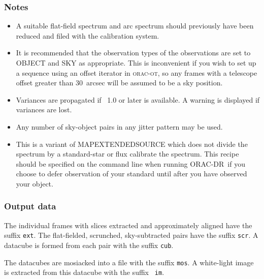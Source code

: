 \documentclass[twoside,11pt]{article}
\newcommand{\xref}[3]{#1}
\renewcommand{\_}{\texttt{\symbol{95}}}
\newcommand{\KAPPA}{\xref{{\sc{Kappa}}}{sun95}{}}
\newcommand{\ORACDR}{{\footnotesize ORAC-DR}}
\begin{document}
\subsubsection*{Notes}\begin{itemize}
\item 
  
  A suitable flat-field spectrum and arc spectrum should previously
  have been reduced and filed with the calibration system.

\item 

It is recommended that the observation types of the observations are set
to OBJECT and SKY as appropriate. This is inconvenient if you wish to
set up a sequence using an offset iterator in \textsc{orac-ot}, so any frames
with a telescope offset greater than 30~arcsec will be assumed to be a
sky position.

\item 

Variances are propagated if \KAPPA\ 1.0 or later is available. A warning
is displayed if variances are lost.

\item 

Any number of sky-object pairs in any jitter pattern may be used.

\item 
    This is a variant of MAP\_EXTENDED\_SOURCE which does not divide the
  spectrum by a standard-star or flux calibrate the spectrum. This
  recipe should be specified on the command line when running
  \ORACDR\ if you choose to defer observation of your standard until
  after you have observed your object.
  

\end{itemize}

\subsubsection*{Output data}

The individual frames with slices extracted and approximately aligned
have the suffix {\tt \_ext}. The flat-fielded, scrunched,
sky-subtracted pairs have the suffix {\tt \_scr}. A datacube is
formed from each pair with the suffix {\tt \_cub}.

The datacubes are mosiacked into a file with the suffix {\tt \_mos}. A
white-light image is extracted from this datacube with the suffix {\tt
  \_im}.

\clearpage
\end{document}
